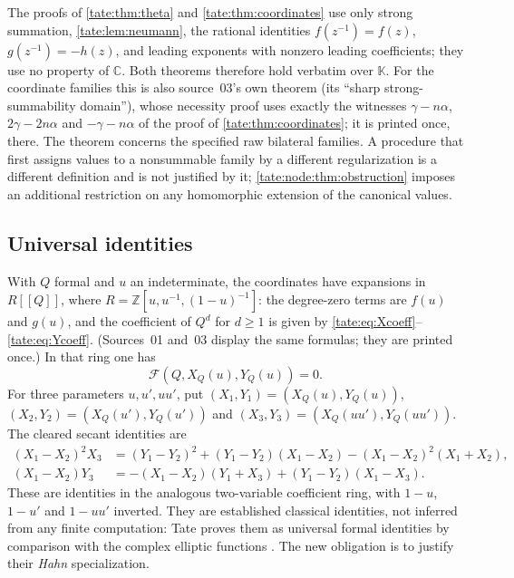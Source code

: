 \documentclass[11pt,letterpaper]{article}
\theoremstyle{definition}
\newcommand{\C}{\mathbb C}
\newcommand{\Z}{\mathbb Z}
\newcommand{\Fp}{\mathcal F}
\newcommand{\KK}{\mathbb K}
\begin{document}
The proofs of \cref{tate:thm:theta} and \cref{tate:thm:coordinates} use
only strong summation, \cref{tate:lem:neumann}, the rational identities
$f(z^{-1})=f(z)$, $g(z^{-1})=-h(z)$, and leading exponents with nonzero
leading coefficients; they use no property of $\C$. Both theorems therefore
hold verbatim over $\KK$. For the coordinate families this is also source~03's
own theorem (its ``sharp strong-summability domain''), whose necessity proof
uses exactly the witnesses $\gamma-n\alpha$, $2\gamma-2n\alpha$ and
$-\gamma-n\alpha$ of the proof of \cref{tate:thm:coordinates}; it is printed
once, there. The theorem concerns the specified raw bilateral families. A
procedure that first assigns values to a nonsummable family by a different
regularization is a different definition and is not justified by it;
\cref{tate:node:thm:obstruction} imposes an additional restriction on any
homomorphic extension of the canonical values.

\subsection{Universal identities}

With $Q$ formal and $u$ an indeterminate, the coordinates have expansions
in $R[[Q]]$, where $R=\Z[u,u^{-1},(1-u)^{-1}]$: the degree-zero terms are
$f(u)$ and $g(u)$, and the coefficient of $Q^d$ for $d\ge1$ is given by
\eqref{tate:eq:Xcoeff}--\eqref{tate:eq:Ycoeff}. (Sources~01 and~03 display the
same formulas; they are printed once.) In that ring one has
\begin{equation}
 \Fp(Q,X_Q(u),Y_Q(u))=0.\label{tate:node:eq:universalcurve}
\end{equation}
For three parameters $u,u',uu'$, put $(X_1,Y_1)=(X_Q(u),Y_Q(u))$,
$(X_2,Y_2)=(X_Q(u'),Y_Q(u'))$ and $(X_3,Y_3)=(X_Q(uu'),Y_Q(uu'))$. The
cleared secant identities are
\begin{align}
 (X_1-X_2)^2X_3
  &=(Y_1-Y_2)^2+(Y_1-Y_2)(X_1-X_2)-(X_1-X_2)^2(X_1+X_2),
  \label{tate:node:eq:secant1}\\
 (X_1-X_2)Y_3
  &=-(X_1-X_2)(Y_1+X_3)+(Y_1-Y_2)(X_1-X_3).
 \label{tate:node:eq:secant2}
\end{align}
These are identities in the analogous two-variable coefficient ring, with
$1-u$, $1-u'$ and $1-uu'$ inverted. They are established classical
identities, not inferred from any finite computation: Tate proves them as
universal formal identities by comparison with the complex elliptic
functions \cite[Theorem~1, pp.~6--7, especially (25$'$)]{Tate}. The new
obligation is to justify their \emph{Hahn} specialization.
\end{document}
